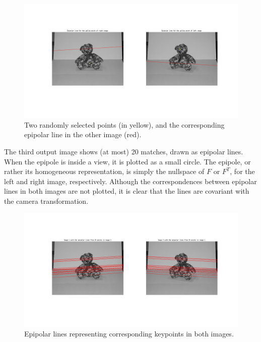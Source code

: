 \documentclass[a4paper,10pt]{article}
\begin{document}
\begin{figure}[h!]
  \centering
    \includegraphics[width=1\textwidth]{EpipolarLines}
  \caption{Two randomly selected points (in yellow), and the corresponding epipolar line in the other image (red).}
  \label{fig:epilines}
\end{figure}


The third output image shows (at most) 20 matches, drawn as epipolar lines.
When the epipole is inside a view, it is plotted as a small circle.
The epipole, or rather its homogeneous representation, is simply the nullspace of $F$ or $F^T$, for the left and right image, respectively.
Although the correspondences between epipolar lines in both images are not plotted, it is clear that the lines are covariant with the camera transformation.

\begin{figure}[h!]
  \centering
    \includegraphics[width=1\textwidth]{Epipolarlines2}
  \caption{Epipolar lines representing corresponding keypoints in both images.}
  \label{fig:epi2}
\end{figure}
\end{document}
